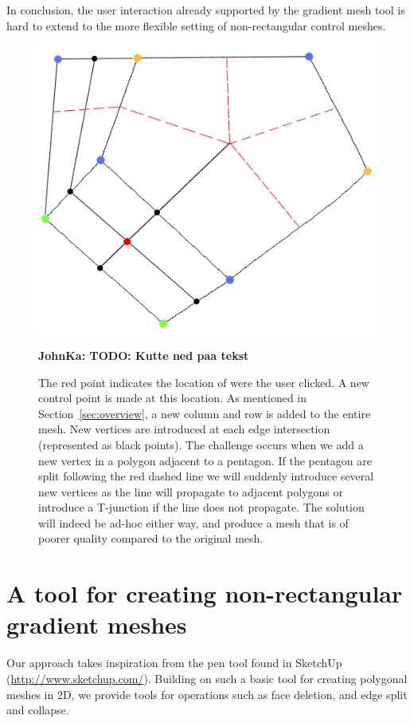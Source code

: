 \documentclass{egpubl}
\newcommand{\note}[3]{{\color{#2}\textbf{#1: #3}}}
\newcommand{\john}[1]{\note{JohnKa}{RubineRed}{#1}}
\begin{document}
	In conclusion, the user interaction already supported by the gradient mesh tool is hard to extend to the more flexible setting of non-rectangular control meshes.
	
	\begin{figure}[t]
		\centering
		\includegraphics[height=0.25\textheight]{pentagonMesh.png}
		\caption{The red point indicates the location of were the user clicked. A new control point is made at this location. As mentioned in Section~\ref{sec:overview}, a new column and row is added to the entire mesh. New vertices are introduced at each edge intersection (represented as black points). The challenge occurs when we add a new vertex in a polygon adjacent to a pentagon. If the pentagon are split following the red dashed line we will suddenly introduce several new vertices as the line will propagate to adjacent polygons or introduce a T-junction if the line does not propagate. The solution will indeed be ad-hoc either way, and produce a mesh that is of poorer quality compared to the original mesh.
		}
		\john{TODO: Kutte ned paa tekst}
		\label{fig:adHocPentagon}
	\end{figure}
	
	\section{A tool for creating non-rectangular gradient meshes}
	\label{sec:method}
	
	Our approach takes inspiration from the pen tool found in SketchUp (\url{http://www.sketchup.com/}). Building on such a basic tool for creating polygonal meshes in 2D, we provide tools for operations such as face deletion, and edge split and collapse.
	
\end{document}
